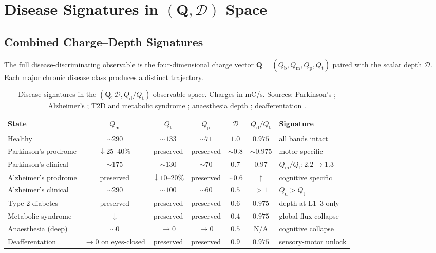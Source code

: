 \documentclass[11pt,twocolumn,a4paper]{article}
\theoremstyle{definition}
\theoremstyle{remark}
\newcommand{\Qb}{Q_{\mathrm{b}}}
\newcommand{\Qm}{Q_{\mathrm{m}}}
\newcommand{\Qp}{Q_{\mathrm{p}}}
\newcommand{\Qt}{Q_{\mathrm{t}}}
\newcommand{\Qd}{Q_{\mathrm{d}}}
\newcommand{\Dhier}{\mathcal{D}}
\begin{document}
\section{Disease Signatures in $(\mathbf{Q}, \Dhier)$ Space}
\label{sec:disease-signatures}

\subsection{Combined Charge--Depth Signatures}

The full disease-discriminating observable is the four-dimensional
charge vector $\mathbf{Q} = (\Qb, \Qm, \Qp, \Qt)$ paired with the
scalar depth $\Dhier$. Each major chronic disease class produces a
distinct trajectory.

\begin{table}[!htb]
\centering
\small
\begin{tabular}{lcccccl}
\toprule
\textbf{State} & $\Qm$ & $\Qt$ & $\Qp$ & $\Dhier$ & $\Qd/\Qt$ & \textbf{Signature} \\
\midrule
Healthy & $\sim 290$ & $\sim 133$ & $\sim 71$ & $1.0$ & $0.975$ & all bands intact \\
Parkinson's prodrome & $\downarrow 25\text{--}40\%$ & preserved & preserved & $\sim 0.8$ & $\sim 0.975$ & motor specific\\
Parkinson's clinical & $\sim 175$ & $\sim 130$ & $\sim 70$ & $0.7$ & $0.97$ & $\Qm/\Qt: 2.2 \to 1.3$ \\
Alzheimer's prodrome & preserved & $\downarrow 10\text{--}20\%$ & preserved & $\sim 0.6$ & $\uparrow$ & cognitive specific \\
Alzheimer's clinical & $\sim 290$ & $\sim 100$ & $\sim 60$ & $0.5$ & $> 1$ & $\Qd > \Qt$ \\
Type 2 diabetes & preserved & preserved & preserved & $0.6$ & $0.975$ & depth at L1--3 only \\
Metabolic syndrome & $\downarrow$ & preserved & preserved & $0.4$ & $0.975$ & global flux collapse \\
Anaesthesia (deep) & $\sim 0$ & $\to 0$ & $\to 0$ & $0.5$ & N/A & cognitive collapse \\
Deafferentation & $\to 0$ on eyes-closed & preserved & preserved & $0.9$ & $0.975$ & sensory-motor unlock \\
\bottomrule
\end{tabular}
\caption{Disease signatures in the $(\mathbf{Q}, \Dhier, \Qd/\Qt)$
observable space. Charges in mC/s. Sources: Parkinson's
\citep{jankovic2008}; Alzheimer's \citep{selkoe2002, bateman2012,
mander2015}; T2D and metabolic syndrome \citep{defronzo2009,
samuel2018}; anaesthesia depth \citep{kelley2003, davidson2005};
deafferentation \citep{rothwell1982, cole1995}.}
\label{tab:disease-signatures}
\end{table}
\end{document}
